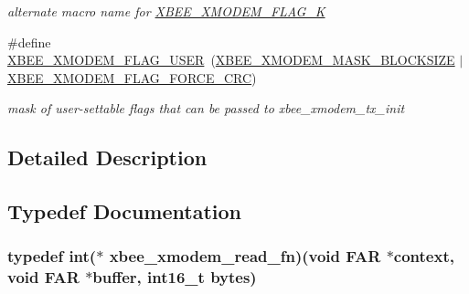 \begin{DoxyCompactItemize}
\begin{DoxyCompactList}\small\item\em alternate macro name for \hyperlink{group__util__xmodem_ga2a13979799d1a7ef697025608545f995}{X\-B\-E\-E\-\_\-\-X\-M\-O\-D\-E\-M\-\_\-\-F\-L\-A\-G\-\_\-K} \end{DoxyCompactList}\item 
\hypertarget{group__util__xmodem_ga6e934cd774ca499fd24333c2d7ef4bda}{\#define \hyperlink{group__util__xmodem_ga6e934cd774ca499fd24333c2d7ef4bda}{X\-B\-E\-E\-\_\-\-X\-M\-O\-D\-E\-M\-\_\-\-F\-L\-A\-G\-\_\-\-U\-S\-E\-R}~(\hyperlink{group__util__xmodem_gaaf04a39f137887085821e34f3e808ee1}{X\-B\-E\-E\-\_\-\-X\-M\-O\-D\-E\-M\-\_\-\-M\-A\-S\-K\-\_\-\-B\-L\-O\-C\-K\-S\-I\-Z\-E} $|$ \hyperlink{group__util__xmodem_ga6c1de4e76820a95412e7db3faa9fd250}{X\-B\-E\-E\-\_\-\-X\-M\-O\-D\-E\-M\-\_\-\-F\-L\-A\-G\-\_\-\-F\-O\-R\-C\-E\-\_\-\-C\-R\-C})}\label{group__util__xmodem_ga6e934cd774ca499fd24333c2d7ef4bda}

\begin{DoxyCompactList}\small\item\em mask of user-\/settable flags that can be passed to xbee\-\_\-xmodem\-\_\-tx\-\_\-init \end{DoxyCompactList}\end{DoxyCompactItemize}


\subsection{Detailed Description}


\subsection{Typedef Documentation}
\hypertarget{group__util__xmodem_gae8f23aee23fead01c5b812e992799ded}{
\subsubsection[{xbee\-\_\-xmodem\-\_\-read\-\_\-fn}]{\setlength{\rightskip}{0pt plus 5cm}typedef int($\ast$ xbee\-\_\-xmodem\-\_\-read\-\_\-fn)(void {\bf F\-A\-R} $\ast$context, void {\bf F\-A\-R} $\ast$buffer, {\bf int16\-\_\-t} bytes)}}\label{group__util__xmodem_gae8f23aee23fead01c5b812e992799ded}


